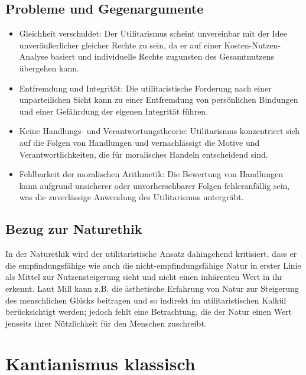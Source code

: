 \documentclass{article}
\begin{document}
\subsection*{Probleme und Gegenargumente}
\begin{itemize}
	\item Gleichheit verschuldet: Der Utilitarismus scheint unvereinbar mit der Idee unveräußerlicher gleicher Rechte zu sein, da er auf einer Kosten-Nutzen-Analyse basiert und individuelle Rechte zugunsten des Gesamtnutzens übergehen kann.

	\item Entfremdung und Integrität: Die utilitaristische Forderung nach einer unparteilichen Sicht kann zu einer Entfremdung von persönlichen Bindungen und einer Gefährdung der eigenen Integrität führen.

	\item Keine Handlungs- und Verantwortungstheorie: Utilitarismus konzentriert sich auf die Folgen von Handlungen und vernachlässigt die Motive und Verantwortlichkeiten, die für moralisches Handeln entscheidend sind.

	\item Fehlbarkeit der moralischen Arithmetik: Die Bewertung von Handlungen kann aufgrund unsicherer oder unvorhersehbarer Folgen fehleranfällig sein, was die zuverlässige Anwendung des Utilitarismus untergräbt.
\end{itemize}

\subsection*{Bezug zur Naturethik}
In der Naturethik wird der utilitaristische Ansatz dahingehend kritisiert, dass er die empfindungsfähige wie auch die nicht-empfindungsfähige Natur in erster Linie als Mittel zur Nutzensteigerung sieht und nicht einen inhärenten Wert in ihr erkennt. Laut Mill kann z.B. die ästhetische Erfahrung von Natur zur Steigerung des menschlichen Glücks beitragen und so indirekt im utilitaristischen Kalkül berücksichtigt werden; jedoch fehlt eine Betrachtung, die der Natur einen Wert jenseits ihrer Nützlichkeit für den Menschen zuschreibt.


\newpage
\section{Kantianismus klassisch}
\end{document}
